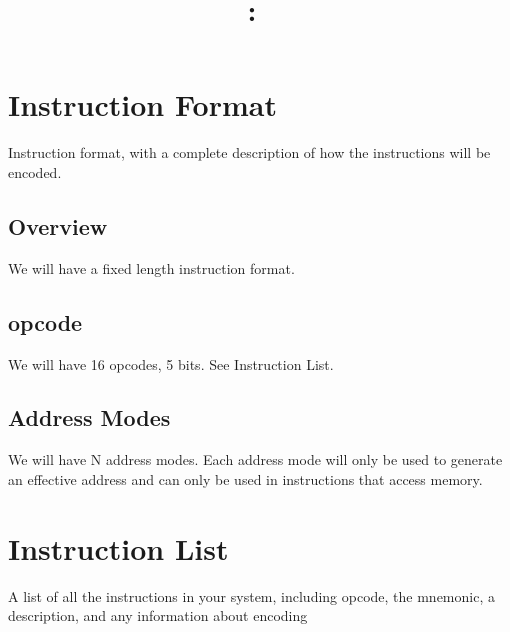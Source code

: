 \documentclass{article}
\title{
    \vspace{2in}
    \textmd{\textbf{\hmwkClass:\ \hmwkTitle}}\\
    \vspace{3in}
}
\author{\hmwkAuthorName}
\date{}
\begin{document}
\maketitle

\pagebreak

\section{Instruction Format}
Instruction format, with a complete description of how the instructions will be encoded.
\subsection{Overview}
We will have a fixed length instruction format.
\subsection{opcode}
We will have 16 opcodes, 5 bits. See Instruction List.
\subsection{Address Modes}
We will have N address modes.
Each address mode will only be used to generate an effective address and can only be used in instructions that access memory.


\section{Instruction List}
A list of all the instructions in your system, including opcode, the mnemonic, a description, and any information about encoding
\end{document}
